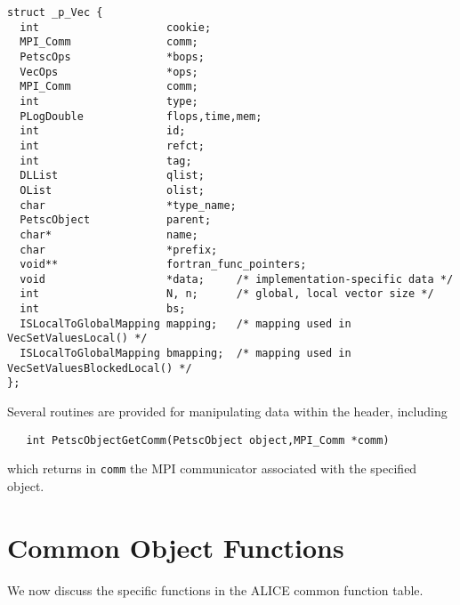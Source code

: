 \documentclass[twoside,12pt]{../sty/report_petsc}
\begin{document}
\begin{verbatim}
struct _p_Vec {
  int                    cookie;                                  
  MPI_Comm               comm;                                    
  PetscOps               *bops;                                   
  VecOps                 *ops;                                    
  MPI_Comm               comm;
  int                    type;                                    
  PLogDouble             flops,time,mem;                          
  int                    id;                                      
  int                    refct;                                   
  int                    tag;                                     
  DLList                 qlist;                                   
  OList                  olist;                                   
  char                   *type_name;                              
  PetscObject            parent;                                  
  char*                  name;                                    
  char                   *prefix;                                 
  void**                 fortran_func_pointers;       
  void                   *data;     /* implementation-specific data */
  int                    N, n;      /* global, local vector size */
  int                    bs;
  ISLocalToGlobalMapping mapping;   /* mapping used in VecSetValuesLocal() */
  ISLocalToGlobalMapping bmapping;  /* mapping used in VecSetValuesBlockedLocal() */
};
\end{verbatim}

Several routines are provided for manipulating data within the header,
including
\begin{verbatim}
   int PetscObjectGetComm(PetscObject object,MPI_Comm *comm) 
\end{verbatim}
which returns in {\tt comm}  the MPI communicator associated with the
specified object.

\section{Common Object Functions}

We now discuss the specific functions in the ALICE common function table.
\end{document}
